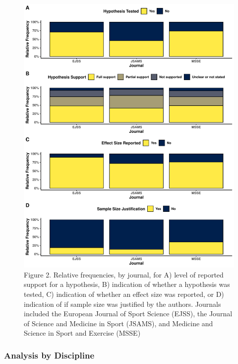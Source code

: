 \documentclass[]{cik}%
\begin{document}
\begin{figure}[H]
\includegraphics[width=1\linewidth]{figure2} \caption{Figure 2. Relative frequencies, by journal, for A) level of reported support for a hypothesis, B) indication of whether a hypothesis was tested, C) indication of whether an effect size was reported, or D) indication of if sample size was justified by the authors. Journals included the European Journal of Sport Science (EJSS), the Journal of Science and Medicine in Sport (JSAMS), and Medicine and Science in Sport and Exercise (MSSE)}\label{fig:fig2}
\end{figure}

\newpage

\hypertarget{analysis-by-discipline}{%
\subsubsection{Analysis by Discipline}\label{analysis-by-discipline}}
\end{document}
